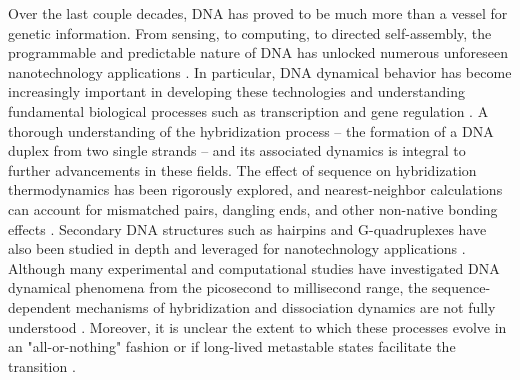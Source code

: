 \documentclass[journal=jpcbfk,manuscript=article]{achemso}
\begin{document}
Over the last couple decades, DNA has proved to be much more than a vessel for genetic information. From sensing, to computing, to directed self-assembly, the programmable and predictable nature of DNA has unlocked numerous unforeseen nanotechnology applications \citep{Seeman2017DNANanotechnology, Adleman1994MolecularProblems, Rothemund2006FoldingPatterns, Gu2010ALine}. In particular, DNA dynamical behavior has become increasingly important in developing these technologies and understanding fundamental biological processes such as transcription and gene regulation \citep{Deluca2020DynamicDevices, Cordes2010SensingTransfer, Naimark2020DNADevelopment}. A thorough understanding of the hybridization process -- the formation of a DNA duplex from two single strands -- and its associated dynamics is integral to further advancements in these fields. The effect of sequence on hybridization thermodynamics has been rigorously explored, and nearest-neighbor calculations can account for mismatched pairs, dangling ends, and other non-native bonding effects \citep{SantaLucia1998AThermodynamics, Santalucia2004TM}. Secondary DNA structures such as hairpins and G-quadruplexes have also been studied in depth and leveraged for nanotechnology applications \citep{Tsukanov2013DetailedOrigami, Mosayebi2014TheFormation, Mergny2019DNANanotechnology}. Although many experimental and computational studies have investigated DNA dynamical phenomena from the picosecond to millisecond range, the sequence-dependent mechanisms of hybridization and dissociation dynamics are not fully understood \citep{Yin2011KineticsHybridization, Xiao2019, Hinckley2014Coarse-grainedEffects, Sanstead2016, Porschke1971CooperativeTransition, Porschke1973ThermodynamicsPairs, Chen2007InfluenceHybridization, Craig1971ElaxationOligon}. Moreover, it is unclear the extent to which these processes evolve in an "all-or-nothing" fashion or if long-lived metastable states facilitate the transition \citep{Araque2016LatticeCooperativity, Sikora2013ModelingIntermediates}.
\end{document}
